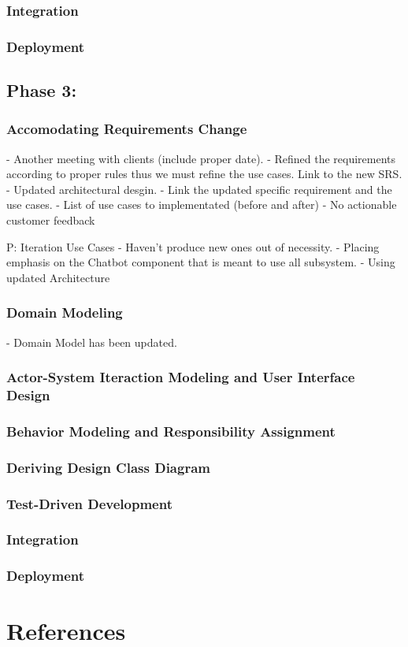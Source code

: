 \documentclass[11pt]{article}
\begin{document}
\subsubsection{Integration}
  
\subsubsection{Deployment}

\subsection{Phase 3:}

\subsubsection{Accomodating Requirements Change}
- Another meeting with clients (include proper date).
- Refined the requirements according to proper rules thus we must refine the use cases. Link to the new SRS.
- Updated architectural desgin.
- Link the updated specific requirement and the use cases.
- List of use cases to implementated (before and after)
- No actionable customer feedback

P: Iteration Use Cases
- Haven't produce new ones out of necessity.
- Placing emphasis on the Chatbot component that is meant to use all subsystem.
- Using updated Architecture

\subsubsection{Domain Modeling}
- Domain Model has been updated.

\subsubsection{Actor-System Iteraction Modeling and User Interface Design}

\subsubsection{Behavior Modeling and Responsibility Assignment}

\subsubsection{Deriving Design Class Diagram}

\subsubsection{Test-Driven Development}

\subsubsection{Integration}

\subsubsection{Deployment}

\section{References}
%
%
\end{document}

